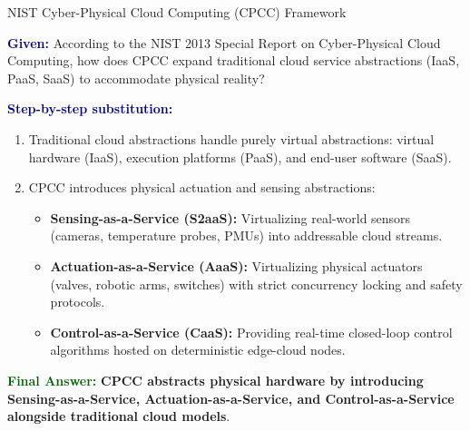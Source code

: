 \documentclass[11pt,a4paper,openany]{report}
\newcommand{\Given}{\par\textbf{\textcolor{navy}{Given:}} }
\newcommand{\Steps}{\par\textbf{\textcolor{navy}{Step-by-step substitution:}}\par}
\newcommand{\Answer}{\par\textbf{\textcolor{darkgreen}{Final Answer:}} }
\begin{document}
\begin{solved}{NIST Cyber-Physical Cloud Computing (CPCC) Framework}
\Given According to the NIST 2013 Special Report on Cyber-Physical Cloud Computing, how does CPCC expand traditional cloud service abstractions (IaaS, PaaS, SaaS) to accommodate physical reality?
\Steps
\begin{enumerate}[leftmargin=*]
  \item Traditional cloud abstractions handle purely virtual abstractions: virtual hardware (IaaS), execution platforms (PaaS), and end-user software (SaaS).
  \item CPCC introduces physical actuation and sensing abstractions:
    \begin{itemize}
      \item \textbf{Sensing-as-a-Service (S2aaS):} Virtualizing real-world sensors (cameras, temperature probes, PMUs) into addressable cloud streams.
      \item \textbf{Actuation-as-a-Service (AaaS):} Virtualizing physical actuators (valves, robotic arms, switches) with strict concurrency locking and safety protocols.
      \item \textbf{Control-as-a-Service (CaaS):} Providing real-time closed-loop control algorithms hosted on deterministic edge-cloud nodes.
    \end{itemize}
\end{enumerate}
\Answer \textbf{CPCC abstracts physical hardware by introducing Sensing-as-a-Service, Actuation-as-a-Service, and Control-as-a-Service alongside traditional cloud models}.
\end{solved}
\end{document}
